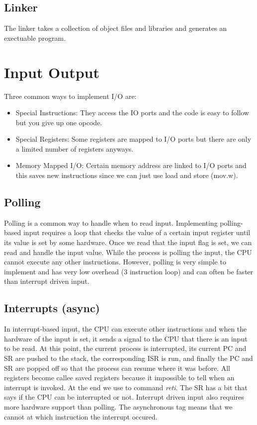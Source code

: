 \documentclass{hw}
\begin{document}
\subsection{Linker}
The linker takes a collection of object files and libraries and generates an 
exectuable program.


\section{Input Output}
Three common ways to implement I/O are:
\begin{itemize}
  \item Special Instructions: They access the IO ports and the code is easy to 
    follow but you give up one opcode.
  \item Special Registers: Some registers are mapped to I/O ports but there are 
    only a limited number of registers anyways.
  \item Memory Mapped I/O: Certain memory address are linked to I/O ports and this
    saves new instructions since we can just use load and store (mov.w).
\end{itemize}

\subsection{Polling}
Polling is a common way to handle when to read input. 
Implementing polling-based input requires a loop that checks the value of a 
certain input register until its value is set by some hardware. Once we read
that the input flag is set, we can read and handle the input value. While the 
process is polling the input, the CPU cannot execute any other instructions. 
However, polling is very simple to implement and has very low overhead (3 instruction
loop) and can often be faster than interrupt driven input.

\subsection{Interrupts (async)}
In interrupt-based input, the CPU can execute other instructions and 
when the hardware of the input is set, it sends a signal to the CPU that there is
an input to be read. At this point, the current process is interrupted, its 
current PC and SR are pushed to the stack, the corresponding ISR is run, and 
finally the PC and SR are popped off so that the process can resume where it was
before. All registers become callee saved registers because it impossible to tell
when an interrupt is invoked. At the end we use to command \emph{reti}. The SR
has a bit that says if the CPU can be interrupted or not. Interrupt driven input
also requires more hardware support than polling. The asynchronous tag means that
we cannot at which instruction the interrupt occured. 
\end{document}
